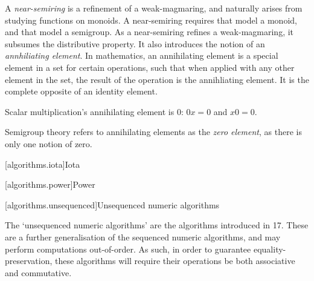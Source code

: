 A \textit{near-semiring} is a refinement of a weak-magmaring, and naturally arises from studying
functions on monoids\cite{wikipedia_near_semiring}. A near-semiring requires that  model
a monoid, and that  model a semigroup. As a near-semiring refines a weak-magmaring, it
subsumes the distributive property. It also introduces the notion of an
\textit{annhiliating element}\cite{wikipedia_absorb}. In mathematics, an annihilating element is a
special element in a set for certain operations, such that when applied with any other element in
the set, the result of the operation is the annihliating element. It is the complete opposite of an
identity element.

\begin{example}
   Scalar multiplication's annihilating element is $0$: $0x = 0$ and $x0 = 0$.
\end{example}

Semigroup theory refers to annihilating elements as the \textit{zero element}, as there is only one
notion of zero.


[algorithms.iota]{Iota}


[algorithms.power]{Power}


[algorithms.unsequenced]{Unsequenced numeric algorithms}

The `unsequenced numeric algorithms' are the  algorithms introduced in \Cpp{}17.
These are a further generalisation of the sequenced numeric algorithms, and may perform computations
out-of-order. As such, in order to guarantee equality-preservation, these algorithms will require
their operations be both associative and commutative.

